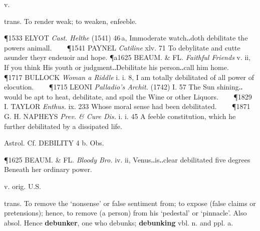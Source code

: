 \begin{description}[wide, labelwidth=!, labelindent=0pt]
 v.

\noindent {}

\vspace{-0.3cm}

\begin{myenumerate}

 trans. To render weak; to weaken, enfeeble.

\P 1533 ELYOT  \textit{Cast. Helthe} (1541) 46 a, Immoderate watch‥doth debilitate the powers animall.    
\P 1541 PAYNEL  \textit{Catiline} xlv. 71 To debylitate and cutte asunder theyr endeuoir and hope.
\P a1625 BEAUM. \& FL.  \textit{Faithful Friends} v. ii, If you think His youth or judgment‥Debilitate his person‥call him home.    
\P 1717 BULLOCK  \textit{Woman a Riddle} i. i. 8, I am totally debilitated of all power of elocution.    
\P 1715 LEONI  \textit{Palladio's Archit.} (1742) I. 57 The Sun shining‥would be apt to heat, debilitate, and spoil the Wine or other Liquors.    
\P 1829 I. TAYLOR  \textit{Enthus.} ix. 233 Whose moral sense had been debilitated.    
\P 1871 G. H. NAPHEYS  \textit{Prev. \& Cure Dis.} i. i. 45 A feeble constitution, which he further debilitated by a dissipated life.

 Astrol. Cf. DEBILITY 4 b. Obs.

\P 1625 BEAUM. \& FL.  \textit{Bloody Bro.} iv. ii, Venus‥is‥clear debilitated five degrees Beneath her ordinary power.
\end{myenumerate}


 v. orig. U.S.

\noindent {}

\noindent [f. de- II. 2 + bunk n.4]
\vspace{-0.3cm}

trans. To remove the ‘nonsense’ or false sentiment from; to expose (false claims or pretensions); hence, to remove (a person) from his ‘pedestal’ or ‘pinnacle’. Also absol. Hence \textbf{debunker}, one who debunks; 
\textbf{debunking} vbl. n. and ppl. a.


\end{description}
